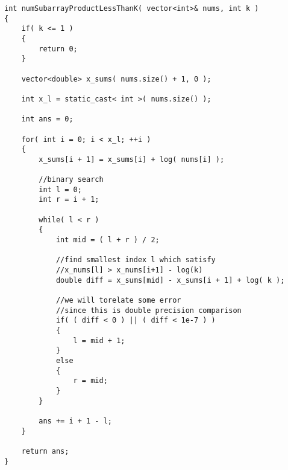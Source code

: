 \begin{lstlisting}[style=customc, caption={Prefix Sum}]
int numSubarrayProductLessThanK( vector<int>& nums, int k )
{
    if( k <= 1 )
    {
        return 0;
    }

    vector<double> x_sums( nums.size() + 1, 0 );

    int x_l = static_cast< int >( nums.size() );

    int ans = 0;

    for( int i = 0; i < x_l; ++i )
    {
        x_sums[i + 1] = x_sums[i] + log( nums[i] );

        //binary search
        int l = 0;
        int r = i + 1;

        while( l < r )
        {
            int mid = ( l + r ) / 2;

            //find smallest index l which satisfy
            //x_nums[l] > x_nums[i+1] - log(k)
            double diff = x_sums[mid] - x_sums[i + 1] + log( k );

            //we will torelate some error
            //since this is double precision comparison
            if( ( diff < 0 ) || ( diff < 1e-7 ) )
            {
                l = mid + 1;
            }
            else
            {
                r = mid;
            }
        }

        ans += i + 1 - l;
    }

    return ans;
}
\end{lstlisting}